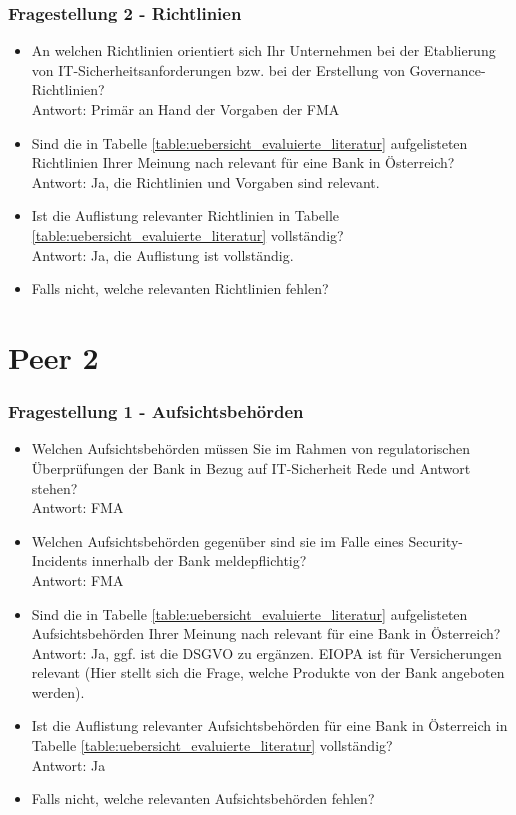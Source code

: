 \subsubsection{Fragestellung 2 - Richtlinien}
\begin{itemize}
    \item An welchen Richtlinien orientiert sich Ihr Unternehmen bei der Etablierung von IT-Sicherheitsanforderungen bzw. bei der Erstellung von Governance-Richtlinien?\\
    Antwort: Primär an Hand der Vorgaben der FMA\\
    \item Sind die in Tabelle \ref{table:uebersicht_evaluierte_literatur} aufgelisteten Richtlinien Ihrer Meinung nach relevant für eine Bank in Österreich?\\
    Antwort: Ja, die Richtlinien und Vorgaben sind relevant.\\
    \item Ist die Auflistung relevanter Richtlinien in Tabelle \ref{table:uebersicht_evaluierte_literatur} vollständig?\\
    Antwort: Ja, die Auflistung ist vollständig.\\
    \item Falls nicht, welche relevanten Richtlinien fehlen?
\end{itemize}
\bigbreak

\section{Peer 2}
\subsubsection{Fragestellung 1 - Aufsichtsbehörden}
\begin{itemize}
    \item Welchen Aufsichtsbehörden müssen Sie im Rahmen von regulatorischen Überprüfungen der Bank in Bezug auf IT-Sicherheit Rede und Antwort stehen?\\
    Antwort: FMA\\
    \item Welchen Aufsichtsbehörden gegenüber sind sie im Falle eines Security-Incidents innerhalb der Bank meldepflichtig?\\
    Antwort: FMA\\
    \item Sind die in Tabelle \ref{table:uebersicht_evaluierte_literatur} aufgelisteten Aufsichtsbehörden Ihrer Meinung nach relevant für eine Bank in Österreich?\\
    Antwort: Ja, ggf. ist die DSGVO zu ergänzen. EIOPA ist für Versicherungen relevant (Hier stellt sich die Frage, welche Produkte von der Bank angeboten werden).\\
    \item Ist die Auflistung relevanter Aufsichtsbehörden für eine Bank in Österreich in Tabelle \ref{table:uebersicht_evaluierte_literatur} vollständig?\\
    Antwort: Ja\\
    \item Falls nicht, welche relevanten Aufsichtsbehörden fehlen?
\end{itemize}
